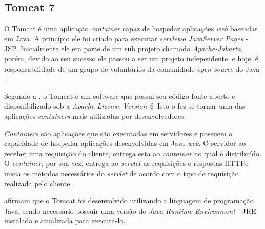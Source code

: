 \subsection{Tomcat 7}

\par O Tomcat é uma aplicação \textit{container} capaz de hospedar aplicações \textit{web} baseadas em Java. A princípio ele foi criado para executar \textit{servlets}\footnotemark[15] e \textit{JavaServer Pages} - JSP\footnotemark[16]. Inicialmente ele era parte de um sub projeto chamado \textit{Apache-Jakarta}, porém, devido ao seu sucesso ele passou a ser um projeto independente, e hoje, é responsabilidade de um grupo de voluntários da comunidade \textit{open source} do Java \cite{vukotic_goodwill_apache_tomcat_7}.



\par Segundo a , o Tomcat é um software que possui seu código fonte aberto e disponibilizado sob a \textit{Apache License Version 2}. Isto o fez se tornar uma das aplicações \textit{containers} mais utilizadas por desenvolvedores.

\par \textit{Containers} são aplicações que são executadas em servidores e possuem a capacidade de hospedar aplicações desenvolvidas em Java \textit{web}. O servidor ao receber uma requisição do cliente, entrega esta ao \textit{container} no qual é distribuído. O \textit{container}, por sua vez, entrega ao \textit{servlet} as requisições e respostas HTTP\footnotemark[17] e inicia os métodos necessários do \textit{servlet} de acordo com o tipo de requisição realizada pelo cliente \cite{basham_sierra_bates_use_cabeca_servlets_jsp}.


\par {} afirmam que o Tomcat foi desenvolvido utilizando a linguagem de programação Java, sendo necessário possuir uma versão do \textit{Java Runtime Environment} - JRE\footnotemark[18] - instalada e atualizada para executá-lo.


